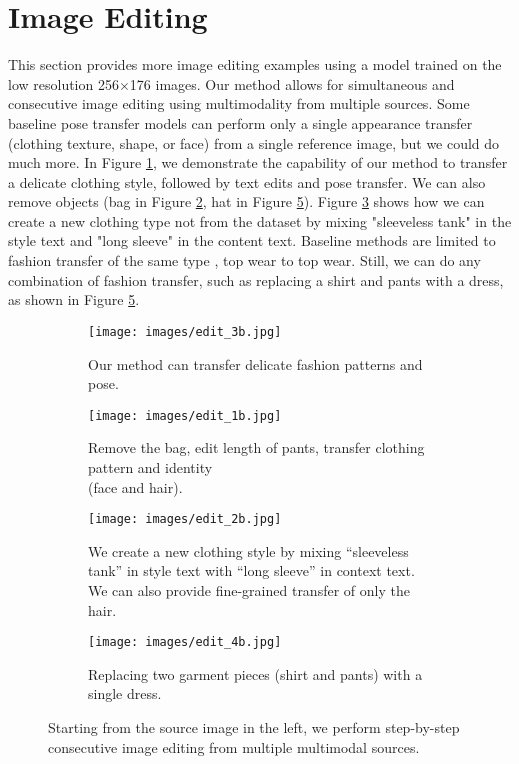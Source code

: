\documentclass[10pt,twocolumn,letterpaper]{article}
\begin{document}
\section{Image Editing}\label{sec:B}
This section provides more image editing examples using a model trained on the low resolution 256$\times$176 images. Our method allows for simultaneous and consecutive image editing using multimodality from multiple sources. Some baseline pose transfer models can perform only a single appearance transfer (clothing texture, shape, or face) from a single reference image, but we could do much more. In Figure \ref{fig:appendix.edit3}, we demonstrate the capability of our method to transfer a delicate clothing style, followed by text edits and pose transfer. We can also remove objects (bag in Figure \ref{fig:appendix.edit1}, hat in Figure \ref{fig:appendix.edit4}). Figure \ref{fig:appendix.edit2} shows how we can create a new  clothing type not from the dataset by mixing "sleeveless tank" in the style text and "long sleeve" in the content text.  Baseline methods are limited to fashion transfer of the same type \ie, top wear to top wear. Still, we can do any combination of fashion transfer, such as replacing a shirt and pants with a dress, as shown in Figure \ref{fig:appendix.edit4}.

\begin{figure}[H]
\begin{subfigure}[]{0.5\columnwidth}
        \centering
        \texttt{[image: images/edit\_3b.jpg]}
        \caption{Our method can transfer delicate fashion patterns and pose.}
        \label{fig:appendix.edit3}
        \end{subfigure}    
        \begin{subfigure}[]{0.5\columnwidth}
        \centering
        \texttt{[image: images/edit\_1b.jpg]}
        \caption{Remove the bag, edit length of pants, transfer clothing pattern and identity \\(face and hair).}
        \label{fig:appendix.edit1}
        \end{subfigure}   
        \begin{subfigure}[]{0.5\columnwidth}
        \centering
        \texttt{[image: images/edit\_2b.jpg]}
        \caption{We create a new clothing style by mixing ``sleeveless tank'' in style text with ``long sleeve'' in context text. We can also provide fine-grained transfer of only the hair.}
        \label{fig:appendix.edit2}
        \end{subfigure}          
        \begin{subfigure}[]{0.5\columnwidth}
        \centering
        \texttt{[image: images/edit\_4b.jpg]}
        \caption{Replacing two garment pieces (shirt and pants) with a single dress.}
        \label{fig:appendix.edit4}
        \end{subfigure}         
                
\vspace{1mm}
\caption{Starting from the source image in the left, we perform step-by-step consecutive image editing from multiple multimodal sources.}
\end{figure}
\end{document}
